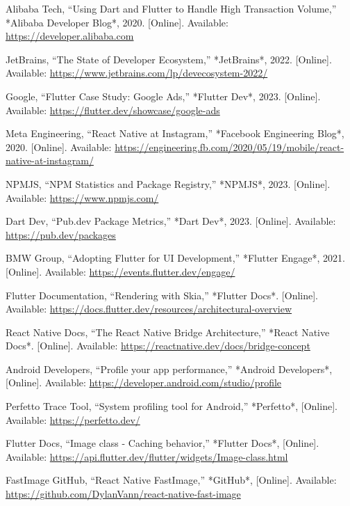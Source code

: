 \documentclass[12pt]{report}
\begin{document}
\begin{thebibliography}{1}
Alibaba Tech, “Using Dart and Flutter to Handle High Transaction Volume,” *Alibaba Developer Blog*, 2020. [Online]. Available: \url{https://developer.alibaba.com}

JetBrains, “The State of Developer Ecosystem,” *JetBrains*, 2022. [Online]. Available: \url{https://www.jetbrains.com/lp/devecosystem-2022/}

Google, “Flutter Case Study: Google Ads,” *Flutter Dev*, 2023. [Online]. Available: \url{https://flutter.dev/showcase/google-ads}

Meta Engineering, “React Native at Instagram,” *Facebook Engineering Blog*, 2020. [Online]. Available: \url{https://engineering.fb.com/2020/05/19/mobile/react-native-at-instagram/}

NPMJS, “NPM Statistics and Package Registry,” *NPMJS*, 2023. [Online]. Available: \url{https://www.npmjs.com/}

Dart Dev, “Pub.dev Package Metrics,” *Dart Dev*, 2023. [Online]. Available: \url{https://pub.dev/packages}

BMW Group, “Adopting Flutter for UI Development,” *Flutter Engage*, 2021. [Online]. Available: \url{https://events.flutter.dev/engage/}

Flutter Documentation, “Rendering with Skia,” *Flutter Docs*. [Online]. Available: \url{https://docs.flutter.dev/resources/architectural-overview}

React Native Docs, “The React Native Bridge Architecture,” *React Native Docs*. [Online]. Available: \url{https://reactnative.dev/docs/bridge-concept}

Android Developers, “Profile your app performance,” *Android Developers*, [Online]. Available: \url{https://developer.android.com/studio/profile}

Perfetto Trace Tool, “System profiling tool for Android,” *Perfetto*, [Online]. Available: \url{https://perfetto.dev/}

Flutter Docs, “Image class - Caching behavior,” *Flutter Docs*, [Online]. Available: \url{https://api.flutter.dev/flutter/widgets/Image-class.html}

FastImage GitHub, “React Native FastImage,” *GitHub*, [Online]. Available: \url{https://github.com/DylanVann/react-native-fast-image}


\end{thebibliography}
\end{document}
